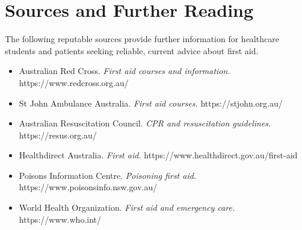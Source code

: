 \section*{Sources and Further Reading}
The following reputable sources provide further information for healthcare students and patients seeking reliable, current advice about first aid.
\begin{itemize}
    \item Australian Red Cross. \textit{First aid courses and information.} https://www.redcross.org.au/
    \item St John Ambulance Australia. \textit{First aid courses.} https://stjohn.org.au/
    \item Australian Resuscitation Council. \textit{CPR and resuscitation guidelines.} https://resus.org.au/
    \item Healthdirect Australia. \textit{First aid.} https://www.healthdirect.gov.au/first-aid
    \item Poisons Information Centre. \textit{Poisoning first aid.} https://www.poisonsinfo.nsw.gov.au/
    \item World Health Organization. \textit{First aid and emergency care.} https://www.who.int/
\end{itemize}
